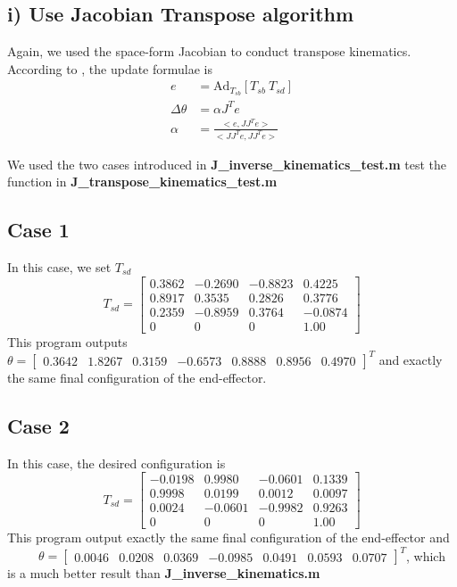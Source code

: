 \documentclass[english,10pt,a4paper]{book}
\begin{document}
    \subsection*{i) Use Jacobian Transpose algorithm}
    Again, we used the space-form Jacobian to conduct transpose kinematics. According to \cite{ik}, the update formulae is 
    \begin{align}
        e &= \text{Ad}_{T_{sb}} [T_{sb} \ T_{sd}]\\ \nonumber
        \Delta\theta &= \alpha J^T e \\
        \alpha &= \frac{<e, JJ^Te>}{<JJ^Te, JJ^Te>}
    \end{align}
    
    We used the two cases introduced in \textbf{J\_inverse\_kinematics\_test.m} test the function in \textbf{J\_transpose\_kinematics\_test.m}
    \subsection*{Case 1}
    In this case, we set $T_{sd}$
    \begin{equation}
        T_{sd} = \begin{bmatrix}
            0.3862 & -0.2690 & -0.8823 & 0.4225\\
            0.8917 & 0.3535 & 0.2826 & 0.3776\\
            0.2359 & -0.8959 & 0.3764 &  -0.0874\\
            0 & 0 & 0 & 1.00
        \end{bmatrix}
    \end{equation}
    This program outputs \(\theta = \begin{bmatrix} 0.3642 & 1.8267 & 0.3159 & -0.6573 & 0.8888 & 0.8956 & 0.4970 \end{bmatrix}^T\) and exactly the same final configuration of the end-effector.

    \subsection*{Case 2}
    In this case, the desired configuration is
    \begin{equation}
        T_{sd} = \begin{bmatrix}
            -0.0198 & 0.9980 & -0.0601 & 0.1339\\
            0.9998 & 0.0199 & 0.0012 & 0.0097\\
            0.0024 & -0.0601 & -0.9982 & 0.9263\\
            0 & 0 & 0 & 1.00
        \end{bmatrix}
    \end{equation}
    This program output exactly the same final configuration of the end-effector and \ \ \ \ \ \(\theta = \begin{bmatrix} 0.0046 & 0.0208 & 0.0369 & -0.0985 & 0.0491 & 0.0593 & 0.0707 \end{bmatrix}^T\), which is a much better result than \textbf{J\_inverse\_kinematics.m}
    
\end{document}
